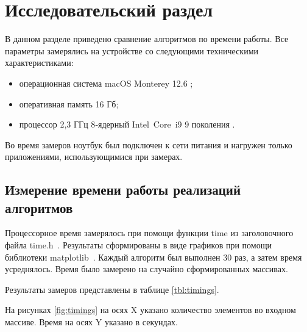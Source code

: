 \chapter{Исследовательский раздел}
\label{cha:research}

В данном разделе приведено сравнение алгоритмов по времени работы.
Все параметры замерялись на устройстве со следующими техническими характеристиками:
\begin{itemize}
	\item операционная система macOS Monterey 12.6 \cite{monterey};
	\item оперативная память 16 Гб;
	\item процессор 2,3 ГГц 8‑ядерный Intel Core i9 9 поколения \cite{intel}.
\end{itemize}

Во время замеров ноутбук был подключен к сети питания и нагружен только приложениями, использующимися при замерах.

\section{Измерение времени работы реализаций алгоритмов}

Процессорное время замерялось при помощи функции time из заголовочного файла time.h~\cite{cplusplus}. Результаты сформированы в виде графиков при помощи библиотеки matplotlib~\cite{matplotlib}.  Каждый алгоритм был выполнен 30 раз, а затем время усреднялось.
Время было замерено на случайно сформированных массивах.

Результаты замеров представлены в таблице \ref{tbl:timings}.

На рисунках \ref{fig:timings} на осях X указано количество элементов во входном массиве. Время на осях Y указано в секундах.

